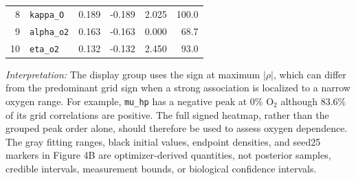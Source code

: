 \begin{table}[!htbp]
{\begin{tabular}{@{}rlrrrr@{}}
8 & \texttt{kappa\_O} & 0.189 & -0.189 & 2.025 & 100.0 \\
9 & \texttt{alpha\_o2} & 0.163 & -0.163 & 0.000 & 68.7 \\
10 & \texttt{eta\_o2} & 0.132 & -0.132 & 2.450 & 93.0 \\
\bottomrule
\end{tabular}%
}
\par\vspace{0.6em}
\begin{minipage}{0.96\textwidth}
\footnotesize
\textit{Interpretation:} The display group uses the sign at maximum $|\rho|$, which can differ from the predominant grid sign when a strong association is localized to a narrow oxygen range. For example, \texttt{mu\_hp} has a negative peak at 0\% O$_2$ although 83.6\% of its grid correlations are positive. The full signed heatmap, rather than the grouped peak order alone, should therefore be used to assess oxygen dependence. The gray fitting ranges, black initial values, endpoint densities, and seed25 markers in Figure 4B are optimizer-derived quantities, not posterior samples, credible intervals, measurement bounds, or biological confidence intervals.
\end{minipage}
\end{table}

